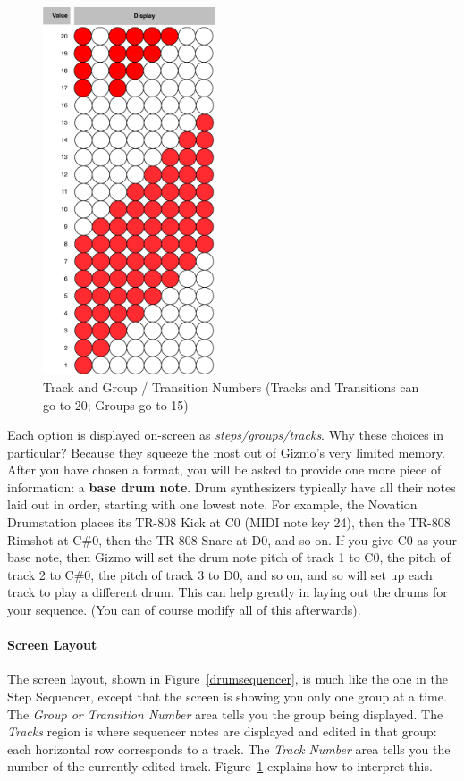 \documentclass{article}
\begin{document}
\begin{figure}
\vspace{-1em}
\includegraphics[width=2in]{20val.pdf}
\vspace{-1em}\caption{\small Track and Group / Transition Numbers (Tracks and Transitions can go to 20; Groups go to 15)}
\vspace{-3em}
\label{trackgrouptransitionnumber}
\end{figure}

\vspace{1em}Each option is displayed on-screen as {\it steps/groups/tracks}.  Why these choices in particular? Because they squeeze the most out of Gizmo's very limited memory.   After you have chosen a format, you will be asked to provide one more piece of information: a {\bf base drum note}.  Drum synthesizers typically have all their notes laid out in order, starting with one lowest note.  For example, the Novation Drumstation places its TR-808 Kick at C0 (MIDI note key 24), then the TR-808 Rimshot at C\#0, then the TR-808 Snare at D0, and so on.  If you give C0 as your base note, then Gizmo will set the drum note pitch of track 1 to C0, the pitch of track 2 to C\#0, the pitch of track 3 to D0, and so on, and so will set up each track to play a different drum. This can help greatly in laying out the drums for your sequence.  (You can of course modify all of this afterwards).

\paragraph{Screen Layout} The screen layout, shown in Figure~\ref{drumsequencer}, is much like the one in the Step Sequencer, except that the screen is showing you only one group at a time.  The {\it Group or Transition Number} area tells you the group being displayed.  The {\it Tracks} region is where sequencer notes are displayed and edited in that group: each horizontal row corresponds to a track.  The {\it Track Number} area tells you the number of the currently-edited track.  Figure~\ref{trackgrouptransitionnumber} explains how to interpret this.
\end{document}
